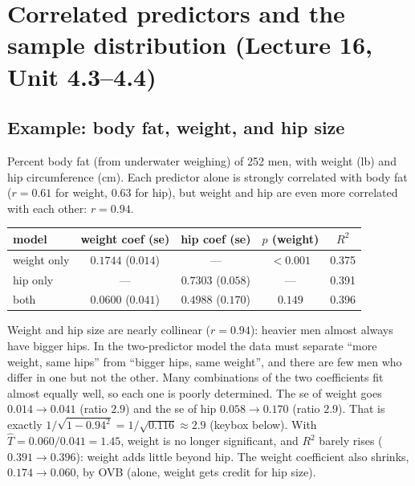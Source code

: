 \documentclass[11pt]{article}
\begin{document}
\section{Correlated predictors and the sample distribution (Lecture 16, Unit 4.3--4.4)}\label{sec:collin}
\subsection{Example: body fat, weight, and hip size}
Percent body fat (from underwater weighing) of 252 men, with weight (lb) and hip circumference (cm). Each predictor alone is strongly
correlated with body fat ($r=0.61$ for weight, $0.63$ for hip), but weight and hip are even more correlated with each other: $r=0.94$.
\begin{center}
\begin{tabular}{@{}lcccc@{}}
\toprule
model & weight coef (se) & hip coef (se) & $p$ (weight) & $R^2$\\\midrule
weight only & $0.1744$ ($0.014$) & --- & $<0.001$ & 0.375\\
hip only & --- & $0.7303$ ($0.058$) & --- & 0.391\\
both & $0.0600$ ($0.041$) & $0.4988$ ($0.170$) & $0.149$ & 0.396\\
\bottomrule
\end{tabular}
\end{center}

\begin{examplebox}[title={Question (10/21): why does the se of weight triple, and weight stop being significant?}]
Weight and hip size are nearly collinear ($r=0.94$): heavier men almost always have bigger hips. In the two-predictor model the data must
separate ``more weight, same hips'' from ``bigger hips, same weight'', and there are few men who differ in one but not the other. Many
combinations of the two coefficients fit almost equally well, so each one is poorly determined. The se of weight goes $0.014\to0.041$ (ratio
$2.9$) and the se of hip $0.058\to0.170$ (ratio $2.9$). That is exactly $1/\sqrt{1-0.94^2}=1/\sqrt{0.116}\approx2.9$ (keybox below).
With $\hat T=0.060/0.041=1.45$, weight is no longer significant, and $R^2$ barely rises ($0.391\to0.396$): weight adds little beyond hip.
The weight coefficient also shrinks, $0.174\to0.060$, by OVB (alone, weight gets credit for hip size).
\end{examplebox}
\end{document}
